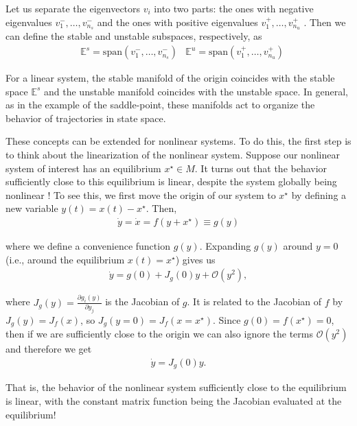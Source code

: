 Let us separate the eigenvectors $v_i$ into two parts: the ones with negative eigenvalues $v^-_1, \ldots, v^-_{n_s}$ and the ones with positive eigenvalues $v^+_1, \ldots, v^+_{n_u}$ . Then we can define the stable and unstable subspaces, respectively, as 
%
\begin{align}
    &\mathbb{E}^s = \mathrm{span}(v^-_1, \ldots, v^-_{n_s})
    &\mathbb{E}^u = \mathrm{span}(v^+_1, \ldots, v^+_{n_u})
\end{align}

For a linear system, the stable manifold of the origin coincides with the stable space $\mathbb{E}^s$ and the unstable manifold coincides with the unstable space.  In general, as in the example of the saddle-point, these manifolds act to organize the behavior of trajectories in state space.


These concepts can be extended for nonlinear systems. To do this, the first step is to think about the linearization of the nonlinear system. Suppose our nonlinear system of interest has an equilibrium $x^\star \in M$. It turns out that the behavior sufficiently close to this equilibrium is linear, despite the system globally being nonlinear \cite{saletan, glendinning}! To see this, we first move the origin of our system to $x^\star$ by defining a new variable $y(t) = x(t) - x^\star$. Then, 
%
\begin{align}
    \dot{y} = \dot{x} = f(y+x^\star) \equiv g(y)
\end{align}

where we define a convenience function $g(y)$. Expanding $g(y)$ around $y=0$ (i.e., around the equilibrium $x(t) = x^\star$) gives us 
%
\begin{align}
    \dot{y} = g(0) + J_g(0) y + \mathcal{O}(y^2),
\end{align}

where $J_g(y) = \frac{\partial g_i(y)}{\partial y_j}$ is the Jacobian of $g$. It is related to the Jacobian of $f$ by $J_g(y) = J_f(x)$, so $J_g(y=0) = J_f(x=x^\star)$. Since $g(0) = f(x^\star) = 0$, then if we are sufficiently close to the origin we can also ignore the terms $\mathcal{O}(y^2)$ and therefore we get 
%
\begin{align}
    \dot{y} = J_g(0) y.
\end{align}

That is, the behavior of the nonlinear system sufficiently close to the equilibrium is linear, with the constant matrix function being the Jacobian evaluated at the equilibrium! 

